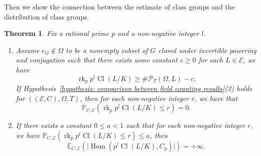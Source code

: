 \documentclass{amsart}
\numberwithin{equation}{section}
\theoremstyle{plain}
\newtheorem{theorem}{Theorem}[section]
\theoremstyle{definition}
\theoremstyle{remark}
\begin{document}
Then we show the connection between the estimate of class groups and the distribution of class groups.
\begin{theorem}\label{thm: 0-prob and infty-moment}
    Fix a rational prime $p$ and a non-negative integer $l$.
    \begin{enumerate}
        \item Assume $e_G\notin\Omega$ to be a nonempty subset of $G$ closed under invertible powering and conjugation such that there exists some constant $c\geq0$ for each $L\in\mathcal{E}$, we have
        \begin{equation*}
            \operatorname{rk}_p p^{l}\operatorname{Cl}(L/K)\geq\#\mathcal{P}_{T}(\Omega,L)-c.
	\end{equation*}
	If Hypothesis~\ref{hypothesis: comparison between field counting results}(2) holds for $((\mathcal{E},C),\Omega,T)$, then for each non-negative integer $r$, we have that
	\begin{equation*}
		\mathbb{P}_{C,\mathcal{E}}(\operatorname{rk}_pp^{l}\operatorname{Cl}(L/K)\leq r)=0.
	\end{equation*}
	\item If there exists a constant $0\leq a<1$ such that for each non-negative integer $r$, we have $\mathbb{P}_{C,\mathcal{E}}(\operatorname{rk}_p p^{l}\operatorname{Cl}(L/K)\leq r)\leq a$, then
	\begin{equation*}
		\mathbb{E}_{C,\mathcal{E}}(\lvert\operatorname{Hom}(p^{l}\operatorname{Cl}(L/K),C_{p})\rvert)=+\infty.
	\end{equation*}
    \end{enumerate}
\end{theorem}
\end{document}
